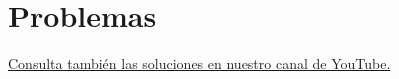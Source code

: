 \section{Problemas}

\href{https://youtube.com/playlist?list=PLI6aSzD0tfIM3VJhCcTle_n-4I2avgMX-}{Consulta también las soluciones en nuestro canal de YouTube.}

